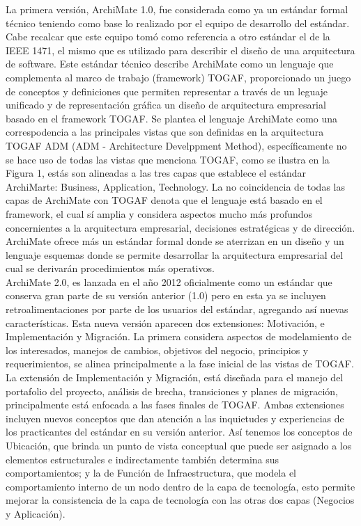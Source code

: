   La primera versión, ArchiMate 1.0, fue considerada como ya un estándar formal técnico teniendo como base lo realizado por el equipo de desarrollo del estándar. Cabe recalcar que este equipo tomó como referencia a otro estándar el de la IEEE 1471, el mismo que es utilizado para describir el diseño de una arquitectura de software. Este estándar técnico describe ArchiMate como un lenguaje que complementa al marco de trabajo (framework) TOGAF, proporcionado un juego de conceptos y definiciones que permiten representar a través de un leguaje unificado y de representación gráfica un diseño de arquitectura empresarial basado en el framework TOGAF. Se plantea el lenguaje ArchiMate como una correspodencia a las principales vistas que son definidas en la arquitectura TOGAF ADM (ADM - Architecture Develppment Method), específicamente no se hace uso de todas las vistas que menciona TOGAF, como se ilustra en la Figura 1, estás son alineadas a las tres capas que establece el estándar ArchiMarte: Business, Application, Technology. La no coincidencia de todas las capas de ArchiMate con TOGAF denota que el lenguaje está basado en el framework, el cual sí amplia y considera aspectos mucho más profundos concernientes a la arquitectura empresarial, decisiones estratégicas y de dirección. ArchiMate ofrece más un estándar formal donde se aterrizan en un diseño y un lenguaje esquemas donde se permite desarrollar la arquitectura empresarial del cual se derivarán procedimientos más operativos. \\
  
  ArchiMate 2.0, es lanzada en el año 2012 oficialmente como un estándar que conserva gran parte de su versión anterior (1.0) pero en esta ya se incluyen retroalimentaciones por parte de los usuarios del estándar, agregando así nuevas características. Esta nueva versión aparecen dos extensiones: Motivación, e Implementación y Migración. La primera considera aspectos de modelamiento de los interesados, manejos de cambios, objetivos del negocio, principios y requerimientos, se alinea principalmente a la fase inicial de las vistas de TOGAF. La extensión de Implementación y Migración, está diseñada para el manejo del portafolio del proyecto, análisis de brecha, transiciones y planes de migración, principalmente está enfocada a las fases finales de TOGAF. Ambas extensiones incluyen nuevos conceptos que dan atención a las inquietudes y experiencias de los practicantes del estándar en su versión anterior. Así tenemos los conceptos de Ubicación, que brinda un punto de vista conceptual que puede ser asignado a los elementos estructurales e indirectamente también determina sus comportamientos; y la de Función de Infraestructura, que modela el comportamiento interno de un nodo dentro de la capa de tecnología, esto permite mejorar la consistencia de la capa de tecnología con las otras dos capas (Negocios y Aplicación). \\
  
